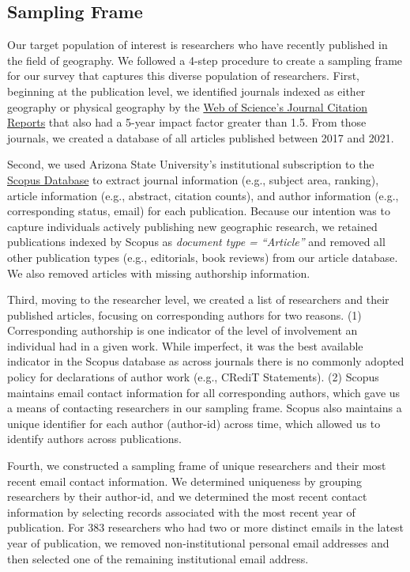 \documentclass[]{interact}
\theoremstyle{plain}%
\theoremstyle{definition}
\theoremstyle{remark}
\begin{document}
\subsection*{Sampling Frame}
Our target population of interest is researchers who have recently published in the field of geography. 
We followed a 4-step procedure to create a sampling frame for our survey that captures this diverse population of researchers. First, beginning at the publication level, we identified journals indexed as either geography or physical geography by the \href{https://access.clarivate.com/}{Web of Science's Journal Citation Reports} that also had a 5-year impact factor greater than 1.5.
From those journals, we created a database of all articles published between 2017 and 2021.  

Second, we used Arizona State University's institutional subscription to the \href{https://www.scopus.com/home.uri}{Scopus Database} to extract journal information (e.g., subject area, ranking), article information (e.g., abstract, citation counts), and author information (e.g., corresponding status, email) for each publication. 
Because our intention was to capture individuals actively publishing new geographic research, we retained publications indexed by Scopus as \textit{document type = ``Article''} and removed all other publication types (e.g., editorials, book reviews) from our article database. 
We also removed articles with missing authorship information. 

Third, moving to the researcher level, we created a list of researchers and their published articles, focusing on corresponding authors for two reasons.
(1) Corresponding authorship is one indicator of the level of involvement an individual had in a given work. 
While imperfect, it was the best available indicator in the Scopus database as across journals there is no commonly adopted policy for declarations of author work (e.g., CRediT Statements).
(2) Scopus maintains email contact information for all corresponding authors, which gave us a means of contacting researchers in our sampling frame.
Scopus also maintains a unique identifier for each author (author-id) across time, which allowed us to identify authors across publications. 

Fourth, we constructed a sampling frame of unique researchers and their most recent email contact information. 
We determined uniqueness by grouping researchers by their author-id, and we determined the most recent contact information by selecting records associated with the most recent year of publication. 
For 383 researchers who had two or more distinct emails in the latest year of publication, we removed non-institutional personal email addresses and then selected one of the remaining institutional email address.
\end{document}
